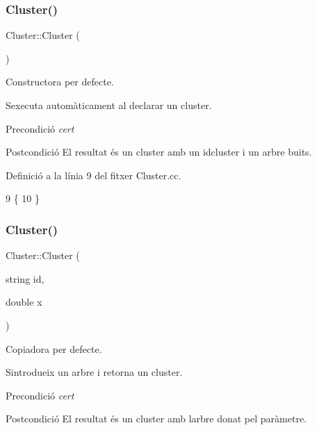 \subsubsection{\texorpdfstring{Cluster()}{Cluster()}\hspace{0.1cm}{\footnotesize\ttfamily [1/2]}}
{\footnotesize\ttfamily Cluster\+::\+Cluster (\begin{DoxyParamCaption}{ }\end{DoxyParamCaption})}



Constructora per defecte. 

S\textquotesingle{}executa automàticament al declarar un cluster.

\begin{DoxyPrecond}{Precondició}
{\itshape cert} 
\end{DoxyPrecond}
\begin{DoxyPostcond}{Postcondició}
El resultat és un cluster amb un idcluster i un arbre buits. 
\end{DoxyPostcond}


Definició a la línia 9 del fitxer Cluster.\+cc.


\begin{DoxyCode}
9                  \{
10 \}
\end{DoxyCode}
\mbox{\label{class_cluster_a816d3dca3b1b678a28af2d31e8fc7e65}} 
\subsubsection{\texorpdfstring{Cluster()}{Cluster()}\hspace{0.1cm}{\footnotesize\ttfamily [2/2]}}
{\footnotesize\ttfamily Cluster\+::\+Cluster (\begin{DoxyParamCaption}\item[{string}]{id,  }\item[{double}]{x }\end{DoxyParamCaption})}



Copiadora per defecte. 

S\textquotesingle{}introdueix un arbre i retorna un cluster.

\begin{DoxyPrecond}{Precondició}
{\itshape cert} 
\end{DoxyPrecond}
\begin{DoxyPostcond}{Postcondició}
El resultat és un cluster amb l\textquotesingle{}arbre donat pel paràmetre. 
\end{DoxyPostcond}


